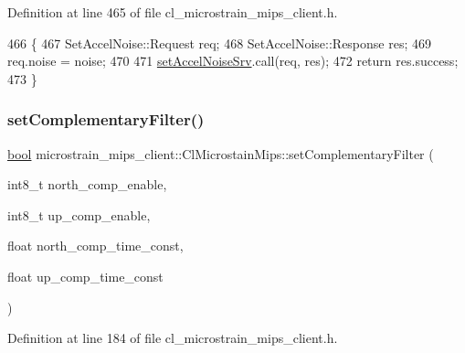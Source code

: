 Definition at line 465 of file cl\+\_\+microstrain\+\_\+mips\+\_\+client.\+h.


\begin{DoxyCode}
466     \{
467         SetAccelNoise::Request req;
468         SetAccelNoise::Response res;
469         req.noise = noise;
470 
471         \hyperlink{classmicrostrain__mips__client_1_1ClMicrostainMips_a9131cf72e9303a83abce526c3780b5df}{setAccelNoiseSrv}.call(req, res);
472         \textcolor{keywordflow}{return} res.success;
473     \}
\end{DoxyCode}
\mbox{\label{classmicrostrain__mips__client_1_1ClMicrostainMips_a08a16f717dad9c8749861a3624fcca06}} 
\subsubsection{\texorpdfstring{set\+Complementary\+Filter()}{setComplementaryFilter()}}
{\footnotesize\ttfamily \hyperlink{classbool}{bool} microstrain\+\_\+mips\+\_\+client\+::\+Cl\+Microstain\+Mips\+::set\+Complementary\+Filter (\begin{DoxyParamCaption}\item[{int8\+\_\+t}]{north\+\_\+comp\+\_\+enable,  }\item[{int8\+\_\+t}]{up\+\_\+comp\+\_\+enable,  }\item[{float}]{north\+\_\+comp\+\_\+time\+\_\+const,  }\item[{float}]{up\+\_\+comp\+\_\+time\+\_\+const }\end{DoxyParamCaption})\hspace{0.3cm}{\ttfamily [inline]}}



Definition at line 184 of file cl\+\_\+microstrain\+\_\+mips\+\_\+client.\+h.



